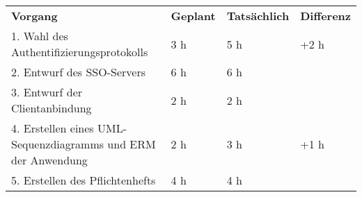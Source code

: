 \begin{tabularx}{\textwidth}{Xlll}
\rowcolor{heading}\textbf{Vorgang} & \textbf{Geplant} & \textbf{Tatsächlich} & \textbf{Differenz} \\
1. Wahl des Authentifizierungsprotokolls & 3 h   & 5 h   & +2 h  \\
\rowcolor{odd}2. Entwurf des SSO-Servers  & 6 h   & 6 h   &  \\
3. Entwurf der Clientanbindung & 2 h   & 2 h   &  \\
\rowcolor{odd}4. Erstellen eines UML-Sequenzdiagramms und ERM der Anwendung & 2 h   & 3 h  & +1 h  \\
5. Erstellen des Pflichtenhefts & 4 h   & 4 h   &  \\
\end{tabularx}
